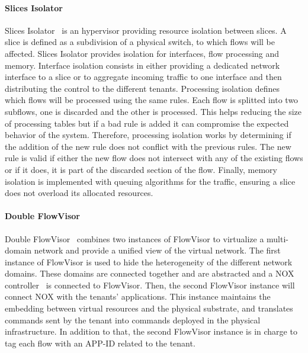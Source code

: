\paragraph{Slices Isolator}
Slices Isolator~\cite{SlicesIsolator-El-Azzab2011} is an hypervisor providing resource isolation between slices. A slice is defined as a subdivision of a physical switch, to which flows will be affected. Slices Isolator provides isolation for interfaces, flow processing and memory. Interface isolation consists in either providing a dedicated network interface to a slice or to aggregate incoming traffic to one interface and then distributing the control to the different tenants. Processing isolation defines which flows will be processed using the same rules. Each flow is splitted into two subflows, one is discarded and the other is processed. This helps reducing the size of processing tables but if a bad rule is added it can compromise the expected behavior of the system. Therefore, processing isolation works by determining if the addition of the new rule does not conflict with the previous rules. The new rule is valid if either the new flow does not intersect with any of the existing flows or if it does, it is part of the discarded section of the flow. Finally, memory isolation is implemented with queuing algorithms for the traffic, ensuring a slice does not overload its allocated resources. 

\paragraph{Double FlowVisor}
Double FlowVisor~\cite{DoubleFV-Yin2013} combines two instances of FlowVisor to virtualize a multi-domain network and provide a unified view of the virtual network. The first instance of FlowVisor is used to hide the heterogeneity of the different network domains. These domains are connected together and are abstracted and a NOX controller~\cite{nox-gude2008} is connected to FlowVisor.
Then, the second FlowVisor instance will connect NOX with the tenants' applications. This instance maintains the embedding between virtual resources and the physical substrate, and translates commands sent by the tenant into commands deployed in the physical infrastructure. In addition to that, the second FlowVisor instance is in charge to tag each flow with an APP-ID related to the tenant.

